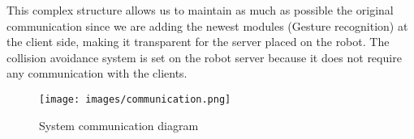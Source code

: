 This complex structure allows us to maintain as much as possible the original communication since we are adding the newest modules (Gesture recognition) at the client side, making it transparent for the server placed on the robot. The collision avoidance system is set on the robot server because it does not require any communication with the clients.

\begin{figure}[htb!]
\centering
\texttt{[image: images/communication.png]}
\caption{System communication diagram}
\label{fig:com}
\end{figure}
